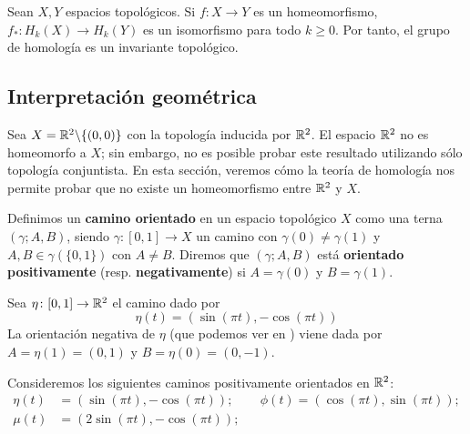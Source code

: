 \begin{theorem}
	Sean $X,Y$ espacios topológicos.
	Si $f\colon X \to Y$ es un homeomorfismo, $f_*\colon H_k(X) \to H_k(Y)$ es un isomorfismo para todo $k \geq 0$.
	Por tanto, el grupo de homología es un invariante topológico.
\end{theorem}

\subsection{Interpretación geométrica}
Sea $X=\mathbb{R}^2\backslash\{(0,0)\}$ con la topología inducida por $\mathbb{R}^2$. El
espacio $\mathbb{R}^2$ no es homeomorfo a $X$; sin embargo, no es posible probar
este resultado utilizando sólo topología conjuntista. En esta sección, veremos
cómo la teoría de homología nos permite probar que no existe un homeomorfismo
entre $\mathbb{R}^2$ y $X$.

Definimos un \textbf{camino orientado} en un espacio topológico $X$ como una
terna $(\gamma; A,B)$, siendo $\gamma\colon [0,1] \to X$ un camino
con $\gamma(0)\neq \gamma(1)$ y $A,B \in \gamma(\{0,1\})$ con $A\neq B$. Diremos
que $(\gamma; A,B)$ está \textbf{orientado positivamente} (resp.
\textbf{negativamente}) si $A=\gamma(0)$ y $B=\gamma(1)$.

\begin{example}
Sea $\eta\colon [0,1] \to \mathbb{R}^2$ el camino dado por
\[\eta(t)=(\sin(\pi t),-\cos(\pi t))\]
La orientación negativa de $\eta$ (que podemos ver en
) viene dada por $A=\eta(1)=(0,1)$ y $B=\eta(0)=(0,-1)$.
\end{example}


Consideremos los siguientes caminos positivamente orientados en $\mathbb{R}^2$:
\begin{align*}
\eta(t)	&=(\sin(\pi t),-\cos(\pi t)); &&\phi(t)=(\cos(\pi t),\sin(\pi t));\\
\mu(t)	&=(2\sin(\pi t),-\cos(\pi t));
\end{align*}

